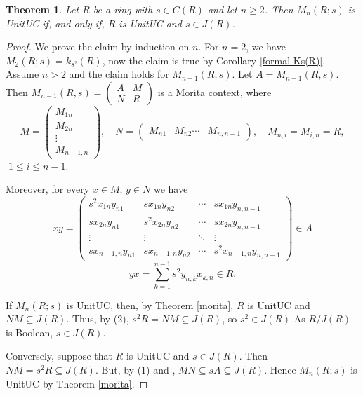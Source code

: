\documentclass[12pt]{amsart}
\newtheorem{theorem}{Theorem}[section]
\theoremstyle{definition}
\begin{document}
\begin{theorem}
Let $R$ be a ring with $s \in C(R)$ and let $n \ge 2$. Then $M_n(R; s)$ is   UnitUC if, and only if, $R$ is   UnitUC and $s \in J(R)$.    
\end{theorem}
\begin{proof}
We prove the claim by induction on $n$. For $n=2$, we have $M_2(R; s)=k_{s^2}(R)$, now the claim is true by Corollary \ref{formal Ks(R)}. Assume $n>2$ and the claim holds for $M_{n-1}(R,s)$. Let $A=M_{n-1}(R,s)$. Then 
$M_{n-1}(R,s)=\begin{pmatrix}A & M \\ N & R\end{pmatrix}$
is a Morita context, where 
$$M= \begin{pmatrix} M_{1n} \\  M_{2n} \\ \vdots \\  M_{n-1,n}\end{pmatrix},\quad
N= \begin{pmatrix} M_{n1} & M_{n2}  \cdots  & M_{n,n-1}\end{pmatrix}, \quad
M_{n,i}=M_{i,n}=R,$$
 $\;1 \le i \le n-1.$

Moreover, for every $x \in M$, $y\in N$ we have
\begin{equation}
   xy= \begin{pmatrix}
s^2x_{1n}y_{n1} & sx_{1n}y_{n2} & \cdots & sx_{1n}y_{n,n-1} \\
sx_{2n}y_{n1} & s^2x_{2n}y_{n2} & \cdots & sx_{2n}y_{n,n-1} \\
\vdots & \vdots & \ddots & \vdots\\
sx_{n-1,n}y_{n1} & sx_{n-1,n}y_{n2} & \cdots & s^2x_{n-1,n}y_{n,n-1}
\end{pmatrix}\in A 
\end{equation}
\begin{equation}
    yx= \sum_{k=1}^{n-1}s^2y_{n,k}x_{k,n} \in R.
\end{equation}

If $M_n(R; s)$ is   UnitUC, then, by Theorem \ref{morita}, $R$ is   UnitUC and $NM \subseteq J(R)$. Thus, by (2), $s^2R = NM \subseteq J(R)$, so $s^2 \in J(R)$ As $R/J(R)$ is Boolean, $s \in J(R)$.

Conversely, suppose that $R$ is   UnitUC and $s \in J(R)$. Then $NM = s^2R \subseteq J(R)$. But, by (1) and \cite[Theorem 11]{zhou3}, $MN \subseteq sA \subseteq J(R)$. Hence $M_n(R; s)$ is   UnitUC by Theorem \ref{morita}.
\end{proof}
\end{document}
